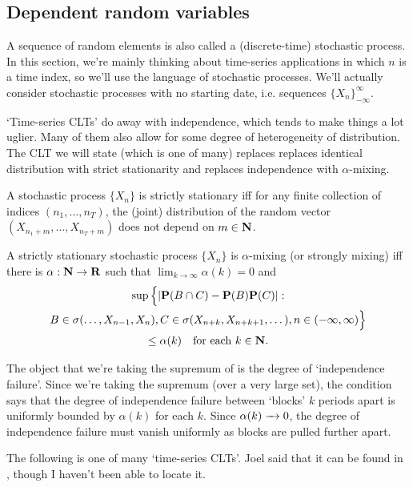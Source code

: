 \documentclass[11pt,letterpaper,reqno,oneside]{article}
\begin{document}
\subsection{Dependent random variables}
\label{sec:CLTs:dependent}

A sequence of random elements is also called a (discrete-time) stochastic process. In this section, we're mainly thinking about time-series applications in which $n$ is a time index, so we'll use the language of stochastic processes. We'll actually consider stochastic processes with no starting date, i.e. sequences $\{ X_n \}_{-\infty}^\infty$.

`Time-series CLTs' do away with independence, which tends to make things a lot uglier. Many of them also allow for some degree of heterogeneity of distribution. The CLT we will state (which is one of many) replaces replaces identical distribution with strict stationarity and replaces independence with $\alpha$-mixing.
%
\begin{definition}
	A stochastic process $\{ X_n \}$ is strictly stationary iff for any finite collection of indices $( n_1, \dots, n_T )$, the (joint) distribution of the random vector $\left( X_{n_1+m}, \dots, X_{n_T+m} \right)$ does not depend on $m \in \mathbf{N}$.
\end{definition}
%
\begin{definition}
	A strictly stationary stochastic process $\{ X_n \}$ is $\alpha$-mixing (or strongly mixing) iff there is $\alpha : \mathbf{N} \to \mathbf{R}$ such that $\lim_{k\to\infty} \alpha(k) = 0$ and
	\begin{multline*}
		\sup \Big\{
		\abs*{ \PP( B \intersect C ) - \PP(B)\PP(C) }
		: 
		\\
		B \in \sigma(\dots,X_{n-1},X_n),
		C \in \sigma(X_{n+k},X_{n+k+1},\dots),
		n \in (-\infty,\infty)
		\Big\}
		\\
		\leq \alpha(k)
		\quad\text{for each $k \in \N$} .
	\end{multline*}
\end{definition}
%
The object that we're taking the supremum of is the degree of `independence failure'. Since we're taking the supremum (over a very large set), the condition says that the degree of independence failure between `blocks' $k$ periods apart is uniformly bounded by $\alpha(k)$ for each $k$. Since $\alpha(k) \xrightarrow{\;\;\;} 0$, the degree of independence failure must vanish uniformly as blocks are pulled further apart.

The following is one of many `time-series CLTs'. Joel said that it can be found in \textcite{White2001}, though I haven't been able to locate it.
\end{document}
